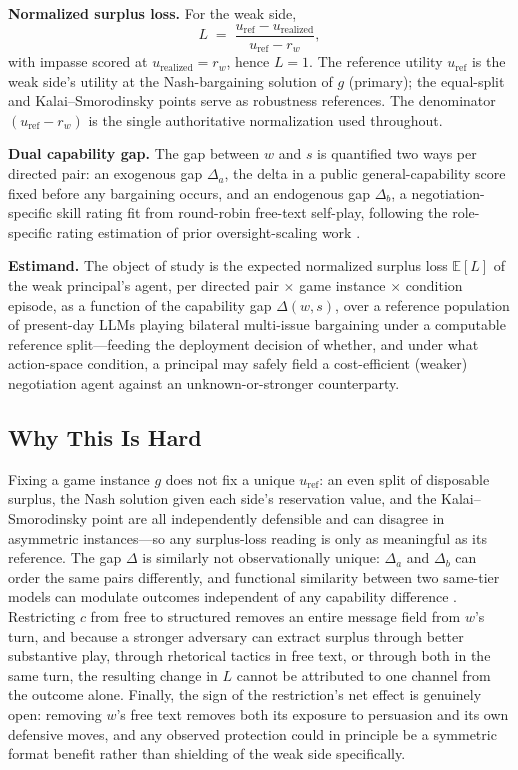 \documentclass[conference]{IEEEtran}
\begin{document}
\textbf{Normalized surplus loss.} For the weak side,
\begin{equation}
L \;=\; \frac{u_{\mathrm{ref}} - u_{\mathrm{realized}}}{u_{\mathrm{ref}} - r_w},
\label{eq:loss}
\end{equation}
with impasse scored at $u_{\mathrm{realized}} = r_w$, hence $L{=}1$. The reference utility $u_{\mathrm{ref}}$ is the weak side's utility at the Nash-bargaining solution of $g$ (primary); the equal-split and Kalai--Smorodinsky points serve as robustness references. The denominator $(u_{\mathrm{ref}} - r_w)$ is the single authoritative normalization used throughout.

\textbf{Dual capability gap.} The gap between $w$ and $s$ is quantified two ways per directed pair: an exogenous gap $\Delta_a$, the delta in a public general-capability score fixed before any bargaining occurs, and an endogenous gap $\Delta_b$, a negotiation-specific skill rating fit from round-robin free-text self-play, following the role-specific rating estimation of prior oversight-scaling work \cite{ScalingLawsOversight}.

\textbf{Estimand.} The object of study is the expected normalized surplus loss $\mathbb{E}[L]$ of the weak principal's agent, per directed pair $\times$ game instance $\times$ condition episode, as a function of the capability gap $\Delta(w,s)$, over a reference population of present-day LLMs playing bilateral multi-issue bargaining under a computable reference split---feeding the deployment decision of whether, and under what action-space condition, a principal may safely field a cost-efficient (weaker) negotiation agent against an unknown-or-stronger counterparty.

\subsection{Why This Is Hard}

Fixing a game instance $g$ does not fix a unique $u_{\mathrm{ref}}$: an even split of disposable surplus, the Nash solution given each side's reservation value, and the Kalai--Smorodinsky point are all independently defensible and can disagree in asymmetric instances---so any surplus-loss reading is only as meaningful as its reference. The gap $\Delta$ is similarly not observationally unique: $\Delta_a$ and $\Delta_b$ can order the same pairs differently, and functional similarity between two same-tier models can modulate outcomes independent of any capability difference \cite{GreatModelsThinkAlike}. Restricting $c$ from \textsf{free} to \textsf{structured} removes an entire message field from $w$'s turn, and because a stronger adversary can extract surplus through better substantive play, through rhetorical tactics in free text, or through both in the same turn, the resulting change in $L$ cannot be attributed to one channel from the outcome alone. Finally, the sign of the restriction's net effect is genuinely open: removing $w$'s free text removes both its exposure to persuasion and its own defensive moves, and any observed protection could in principle be a symmetric format benefit rather than shielding of the weak side specifically.
\end{document}
